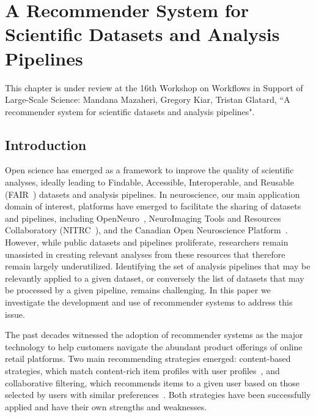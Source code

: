 \chapter{A Recommender System for Scientific Datasets and Analysis Pipelines}
\label{pipeline-dataset-recommender}

This chapter is under review at the 16th Workshop on Workflows in Support of Large-Scale Science: Mandana Mazaheri, Gregory Kiar, Tristan Glatard, ``A recommender system for scientific datasets and analysis pipelines".

\section{Introduction}

Open science has emerged as a framework to improve the quality of
scientific analyses, ideally leading to Findable, Accessible, Interoperable, and
Reusable (FAIR~\cite{wilkinson2016fair}) datasets and analysis pipelines. In
neuroscience, our main application domain of interest, platforms have
emerged to facilitate the sharing of datasets and pipelines, including
OpenNeuro~\cite{gorgolewski2017openneuro}, NeuroImaging Tools and Resources Collaboratory (NITRC~\cite{kennedy2016nitrc}), and the Canadian Open
Neuroscience Platform~\cite{conp}. However, while public
datasets and pipelines proliferate, researchers remain unassisted in
creating relevant analyses from these resources that therefore remain
largely underutilized. Identifying the set of analysis pipelines that may
be relevantly applied to a given dataset, or conversely the list of datasets that may be processed by
a given pipeline, remains challenging. In this paper we investigate
the development and use of recommender systems to address this issue.


The past decades witnessed the adoption of recommender systems as the major
 technology to help customers navigate the abundant product offerings of
 online retail platforms. Two main
 recommending strategies emerged: content-based strategies, which match content-rich item profiles with user profiles~\cite{pazzani2007content},
 and collaborative filtering, which recommends items to a given user based on those
 selected by users with similar preferences~\cite{rajaraman2011mining}.
 Both strategies have been successfully applied and have their own strengths and weaknesses.
 
